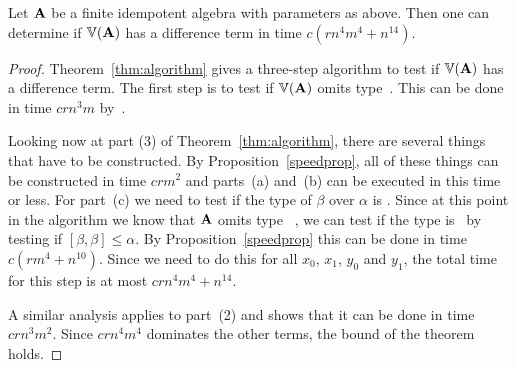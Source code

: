 







\begin{theorem}\label{thm:time}
Let $\mathbf{A}$ be a finite idempotent algebra with parameters as
above.
Then one can determine if $\operatorname{\mathbb{V}}(\mathbf{A})$ has a difference
term in time $c(rn^4m^4 + n^{14})$.
\end{theorem}

\begin{proof}
Theorem~\ref{thm:algorithm} gives a three-step
algorithm to test
if $\operatorname{\mathbb{V}} (\mathbf{A})$ has a difference term.
The first step is to test if $\operatorname{\mathbb{V}} (\mathbf{A})$ omits type~\utyp. This
can be done in time $crn^3m$
by~\cite[Theorem~6.3]{Freese:2009}.

Looking now at part (3) of Theorem~\ref{thm:algorithm},
there are several things that have to be constructed.
By Proposition~\ref{speedprop}, all
of these things can be constructed in time $crm^2$ and
parts~(a) and~(b) can be executed in this time or less.
For part~(c) we need to test if the type of $\beta$
over $\alpha$ is \atyp. Since at this point in the
algorithm we know that $\mathbf{A}$ omits type ~\utyp,
we can test if the type is \atyp\ by testing if
$[\beta,\beta] \le \alpha$. By Proposition~\ref{speedprop}
this can be done in time $c(rm^4 + n^{10})$.
Since we need to do
this for all $x_0$, $x_1$, $y_0$ and $y_1$, the total
time for this step is at most $crn^4m^4 + n^{14}$.

A similar analysis applies to part~(2) and shows that it
can be done in time $crn^3m^2$. Since $crn^4m^4$ dominates
the other terms, the bound of the theorem holds.
\end{proof}



